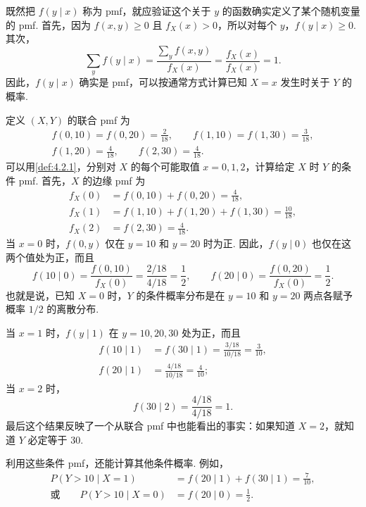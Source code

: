 既然把 $f(y\mid x)$ 称为 pmf，就应验证这个关于 $y$ 的函数确实定义了某个随机变量的 pmf. 首先，因为 $f(x,y)\ge0$ 且 $f_X(x)>0$，所以对每个 $y$，$f(y\mid x)\ge0$. 其次，
$$\sum_y f(y\mid x)=\frac{\sum_y f(x,y)}{f_X(x)}=\frac{f_X(x)}{f_X(x)}=1.$$
因此，$f(y\mid x)$ 确实是 pmf，可以按通常方式计算已知 $X=x$ 发生时关于 $Y$ 的概率.
\begin{example}[条件概率的计算]\label{ex:4.2.2}
定义 $(X,Y)$ 的联合 pmf 为
$$
\begin{gathered}
f(0,10)=f(0,20)=\frac2{18},\qquad f(1,10)=f(1,30)=\frac3{18},\\
f(1,20)=\frac4{18},\qquad f(2,30)=\frac4{18}.
\end{gathered}
$$
可以用\autoref{def:4.2.1}，分别对 $X$ 的每个可能取值 $x=0,1,2$，计算给定 $X$ 时 $Y$ 的条件 pmf. 首先，$X$ 的边缘 pmf 为
$$
\begin{aligned}
f_X(0)&=f(0,10)+f(0,20)=\frac4{18},\\
f_X(1)&=f(1,10)+f(1,20)+f(1,30)=\frac{10}{18},\\
f_X(2)&=f(2,30)=\frac4{18}.
\end{aligned}
$$
当 $x=0$ 时，$f(0,y)$ 仅在 $y=10$ 和 $y=20$ 时为正. 因此，$f(y\mid0)$ 也仅在这两个值处为正，而且
$$
f(10\mid0)=\frac{f(0,10)}{f_X(0)}=\frac{2/18}{4/18}=\frac12,\qquad
f(20\mid0)=\frac{f(0,20)}{f_X(0)}=\frac12.
$$
也就是说，已知 $X=0$ 时，$Y$ 的条件概率分布是在 $y=10$ 和 $y=20$ 两点各赋予概率 $1/2$ 的离散分布.

当 $x=1$ 时，$f(y\mid1)$ 在 $y=10,20,30$ 处为正，而且
$$
\begin{aligned}
f(10\mid1)&=f(30\mid1)=\frac{3/18}{10/18}=\frac3{10},\\
f(20\mid1)&=\frac{4/18}{10/18}=\frac4{10};
\end{aligned}
$$
当 $x=2$ 时，
$$f(30\mid2)=\frac{4/18}{4/18}=1.$$
最后这个结果反映了一个从联合 pmf 中也能看出的事实：如果知道 $X=2$，就知道 $Y$ 必定等于 30.

利用这些条件 pmf，还能计算其他条件概率. 例如，
$$
\begin{aligned}
P(Y>10\mid X=1)&=f(20\mid1)+f(30\mid1)=\frac7{10},\\
\text{或}\qquad P(Y>10\mid X=0)&=f(20\mid0)=\frac12.
\end{aligned}
$$
\end{example}

